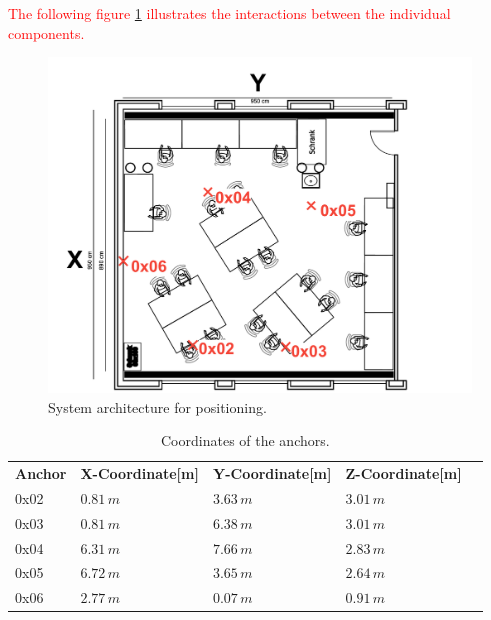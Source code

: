\documentclass[conference, a4paper]{IEEEtran}
\begin{document}
\textcolor{red}{The following figure \ref{fig:systemarch} illustrates the interactions between the individual components.}

\begin{figure}[hbt!]
	\centering
	\includegraphics[scale=0.3]{pic/anchor_position.pdf}
	\caption{System architecture for positioning.}
	\label{fig:systemarch}
\end{figure}

\begin{table}[hbt!]
	\centering
	\begin{tabular}{l l l l c}
		\textbf{Anchor} & \textbf{X-Coordinate[m]} & \textbf{Y-Coordinate[m]} & \textbf{Z-Coordinate[m]}\\
		0x02 & $0.81\,m$ & $3.63\,m$ & $3.01\,m$\\
		0x03 & $0.81\,m$ & $6.38\,m$ & $3.01\,m$\\
		0x04 & $6.31\,m$ & $7.66\,m$ & $2.83\,m$\\
		0x05 & $6.72\,m$ & $3.65\,m$ & $2.64\,m$\\
		0x06 & $2.77\,m$ & $0.07\,m$ & $0.91\,m$\\
		
	\end{tabular}
	\caption{Coordinates of the anchors.}
	\label{table:anchor_positions}
\end{table}
\end{document}
